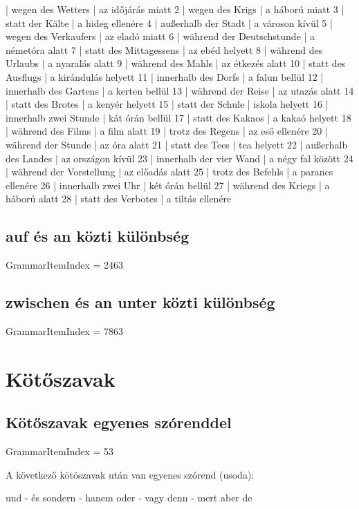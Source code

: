 \documentclass{article}
\newenvironment{desc}{\verbatim}{\endverbatim}
\newenvironment{exmp}{\verbatim}{\endverbatim}
\begin{document}
\begin{exmp}
1 | wegen des Wetters | az időjárás miatt
2 | wegen des Krigs | a háború miatt
3 | statt der Kälte | a hideg ellenére
4 | außerhalb der Stadt | a városon kívül
5 | wegen des Verkaufers | az eladó miatt
6 | während der Deutschstunde | a németóra alatt
7 | statt des Mittagessens | az ebéd helyett
8 | während des Urlaubs | a nyaralás alatt
9 | während des Mahls | az étkezés alatt
10 | statt des Ausflugs | a kirándulás helyett
11 | innerhalb des Dorfs | a falun bellül
12 | innerhalb des Gartens | a kerten bellül
13 | während der Reise | az utazás alatt
14 | statt des Brotes | a kenyér helyett
15 | statt der Schule | iskola helyett
16 | innerhalb zwei Stunde | kát órán bellül
17 | statt des Kakaos | a kakaó helyett
18 | während des Films | a film alatt
19 | trotz des Regens | az eső ellenére
20 | während der Stunde | az óra alatt
21 | statt des Tees | tea helyett
22 | außerhalb des Landes | az országon kívül
23 | innerhalb der vier Wand | a négy fal között
24 | während der Vorstellung | az előadás alatt
25 | trotz des Befehls | a parancs ellenére
26 | innerhalb zwei Uhr | két órán bellül
27 | während des Kriegs | a háború alatt
28 | statt des Verbotes | a tiltás ellenére
\end{exmp}

\subsection{auf és an közti különbség}

GrammarItemIndex = 2463

\subsection{zwischen és an unter közti különbség}

GrammarItemIndex = 7863

\section{Kötőszavak}

\subsection{Kötőszavak egyenes szórenddel}

GrammarItemIndex = 53

\begin{desc}
A következő kötöszavak után van egyenes szórend (usoda):

und - és
sondern - hanem
oder - vagy
denn - mert
aber  de

\end{desc}
\end{document}
